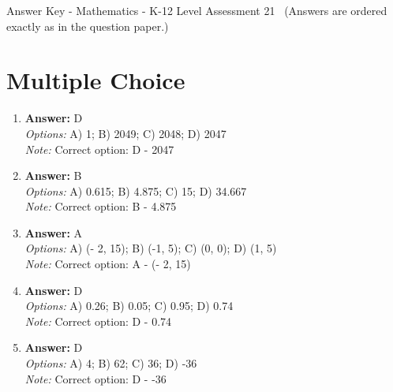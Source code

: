 \documentclass[12pt]{article}
\begin{document}
\begin{center}
Answer Key - Mathematics - K-12 Level Assessment 21 \
\small (Answers are ordered exactly as in the question paper.)
\end{center}

\section*{Multiple Choice}
\begin{enumerate}[label=\arabic*.]
\item \textbf{Answer:} D
\\ \textit{Options:} A) 1; B) 2049; C) 2048; D) 2047
\\ \textit{Note:} Correct option: D - 2047
\item \textbf{Answer:} B
\\ \textit{Options:} A) 0.615; B) 4.875; C) 15; D) 34.667
\\ \textit{Note:} Correct option: B - 4.875
\item \textbf{Answer:} A
\\ \textit{Options:} A) (- 2, 15); B) (-1, 5); C) (0, 0); D) (1, 5)
\\ \textit{Note:} Correct option: A - (- 2, 15)
\item \textbf{Answer:} D
\\ \textit{Options:} A) 0.26; B) 0.05; C) 0.95; D) 0.74
\\ \textit{Note:} Correct option: D - 0.74
\item \textbf{Answer:} D
\\ \textit{Options:} A) 4; B) 62; C) 36; D) -36
\\ \textit{Note:} Correct option: D - -36
\end{enumerate}
\end{document}
